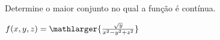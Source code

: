 
Determine o maior conjunto no qual a função é contínua.


\item $ f(x,y,z)=\mathlarger{\frac{\sqrt y}{x^2-y^2+z^2}}$